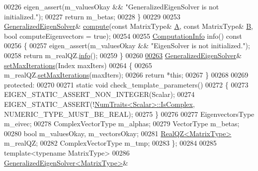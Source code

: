 \begin{DoxyCode}
{00226       eigen\_assert(m\_valuesOkay && \textcolor{stringliteral}{"GeneralizedEigenSolver is not initialized."});
00227       \textcolor{keywordflow}{return} m\_betas;
00228     \}
00229 
00253     \hyperlink{group___eigenvalues___module_class_eigen_1_1_generalized_eigen_solver}{GeneralizedEigenSolver}& \hyperlink{group___eigenvalues___module_a275910b47dfe5f40211dcb59cfd68f3c}{compute}(\textcolor{keyword}{const} MatrixType& 
      \hyperlink{group___core___module_class_eigen_1_1_matrix}{A}, \textcolor{keyword}{const} MatrixType& \hyperlink{group___core___module_class_eigen_1_1_matrix}{B}, \textcolor{keywordtype}{bool} computeEigenvectors = \textcolor{keyword}{true});
00254 
00255     \hyperlink{group__enums_ga85fad7b87587764e5cf6b513a9e0ee5e}{ComputationInfo} info()\textcolor{keyword}{ const}
00256 \textcolor{keyword}{    }\{
00257       eigen\_assert(m\_valuesOkay && \textcolor{stringliteral}{"EigenSolver is not initialized."});
00258       \textcolor{keywordflow}{return} m\_realQZ.\hyperlink{group___eigenvalues___module_a36bd77afed89f3f5c110a715e69e4c64}{info}();
00259     \}
00260 
\hyperlink{group___eigenvalues___module_a2a6f96bd042068cfc0eafba839b424bd}{00263}     \hyperlink{group___eigenvalues___module_class_eigen_1_1_generalized_eigen_solver}{GeneralizedEigenSolver}& \hyperlink{group___eigenvalues___module_a2a6f96bd042068cfc0eafba839b424bd}{setMaxIterations}(Index maxIters)
00264     \{
00265       m\_realQZ.\hyperlink{group___eigenvalues___module_a30ae65666b1757e4a2b6a28eaec12226}{setMaxIterations}(maxIters);
00266       \textcolor{keywordflow}{return} *\textcolor{keyword}{this};
00267     \}
00268 
00269   \textcolor{keyword}{protected}:
00270     
00271     \textcolor{keyword}{static} \textcolor{keywordtype}{void} check\_template\_parameters()
00272     \{
00273       EIGEN\_STATIC\_ASSERT\_NON\_INTEGER(Scalar);
00274       EIGEN\_STATIC\_ASSERT(!\hyperlink{group___core___module_struct_eigen_1_1_num_traits}{NumTraits<Scalar>::IsComplex}, 
      NUMERIC\_TYPE\_MUST\_BE\_REAL);
00275     \}
00276     
00277     EigenvectorsType m\_eivec;
00278     ComplexVectorType m\_alphas;
00279     VectorType m\_betas;
00280     \textcolor{keywordtype}{bool} m\_valuesOkay, m\_vectorsOkay;
00281     \hyperlink{group___eigenvalues___module}{RealQZ<MatrixType>} m\_realQZ;
00282     ComplexVectorType m\_tmp;
00283 \};
00284 
00285 \textcolor{keyword}{template}<\textcolor{keyword}{typename} MatrixType>
00286 \hyperlink{group___eigenvalues___module_class_eigen_1_1_generalized_eigen_solver}{GeneralizedEigenSolver<MatrixType>}&
}
\end{DoxyCode}
